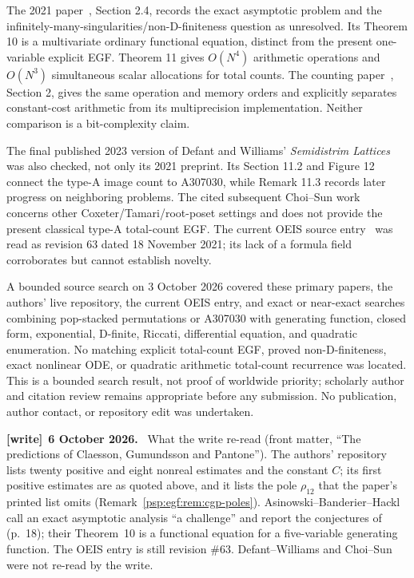 \documentclass[11pt,letterpaper]{article}
\numberwithin{equation}{section}
\theoremstyle{remark}\newtheorem{remark}[theorem]{Remark}
\newenvironment{writenote}[1][]{\par\smallskip\begingroup\small
 \noindent\textbf{[write]}\if\relax\detokenize{#1}\relax\else~\textbf{#1.}\fi\ }%
 {\par\endgroup\smallskip}
\begin{document}
The 2021 paper~\cite{abh}, Section 2.4, records the exact asymptotic
problem and the infinitely-many-singularities/non-D-finiteness question
as unresolved. Its Theorem 10 is a multivariate ordinary functional
equation, distinct from the present one-variable explicit EGF.
Theorem 11 gives $O(N^4)$ arithmetic operations and $O(N^3)$ simultaneous
scalar allocations for total counts. The counting paper~\cite{cgp},
Section 2, gives the same operation and memory orders and explicitly
separates constant-cost arithmetic from its multiprecision implementation.
Neither comparison is a bit-complexity claim.

The final published 2023 version of Defant and Williams'
\emph{Semidistrim Lattices}~\cite{dw} was also checked, not only its
2021 preprint. Its Section 11.2 and Figure 12 connect the type-A image
count to A307030, while Remark 11.3 records later progress on neighboring
problems. The cited subsequent Choi--Sun work~\cite{cs} concerns other
Coxeter/Tamari/root-poset settings and does not provide the present
classical type-A total-count EGF. The current OEIS source entry~\cite{oeisA307030}
was read as revision 63 dated 18 November 2021; its lack of a formula
field corroborates but cannot establish novelty.

A bounded source search on 3 October 2026 covered these primary papers,
the authors' live repository, the current OEIS entry, and exact or
near-exact searches combining pop-stacked permutations or A307030 with
generating function, closed form, exponential, D-finite, Riccati,
differential equation, and quadratic enumeration. No matching explicit
total-count EGF, proved non-D-finiteness, exact nonlinear ODE, or quadratic
arithmetic total-count recurrence was located. This is a bounded search
result, not proof of worldwide priority; scholarly author and citation
review remains appropriate before any submission. No publication,
author contact, or repository edit was undertaken.
\begin{writenote}[6 October 2026]
What the write re-read (front matter, ``The predictions of Claesson, Gu\dh mundsson and Pantone''). The authors' repository \cite{repo} lists twenty positive and eight nonreal estimates and the constant $C$; its first positive estimates are as quoted above, and it lists the pole $\rho_{12}$ that the paper's printed list omits (Remark~\ref{psp:egf:rem:cgp-poles}). Asinowski--Banderier--Hackl \cite[Section~2.4]{abh} call an exact asymptotic analysis ``a challenge'' and report the conjectures of \cite{cgp} (p.~18); their Theorem~10 is a functional equation for a five-variable generating function. The OEIS entry \cite{oeisA307030} is still revision \#63. Defant--Williams \cite{dw} and Choi--Sun \cite{cs} were not re-read by the write.
\end{writenote}
\end{document}
